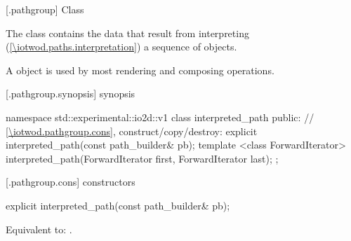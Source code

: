  [\iotwod.pathgroup] {Class }

\pnum
{}%
The class  contains the data that result from interpreting (\ref{\iotwod.paths.interpretation}) a sequence of  objects. %

\pnum
A  object is used by most rendering and composing operations.

%
%
%
%
 [\iotwod.pathgroup.synopsis] { synopsis}

\begin{codeblock}
namespace std::experimental::io2d::v1 {
  class interpreted_path {
    public:
    // \ref{\iotwod.pathgroup.cons}, construct/copy/destroy:
    explicit interpreted_path(const path_builder& pb);
    template <class ForwardIterator>
    interpreted_path(ForwardIterator first, ForwardIterator last);
  };
}
\end{codeblock}

 [\iotwod.pathgroup.cons] { constructors}

%
\begin{itemdecl}
explicit interpreted_path(const path_builder& pb);
\end{itemdecl}
\begin{itemdescr}
\pnum
\effects
Equivalent to: .	
\end{itemdescr}

